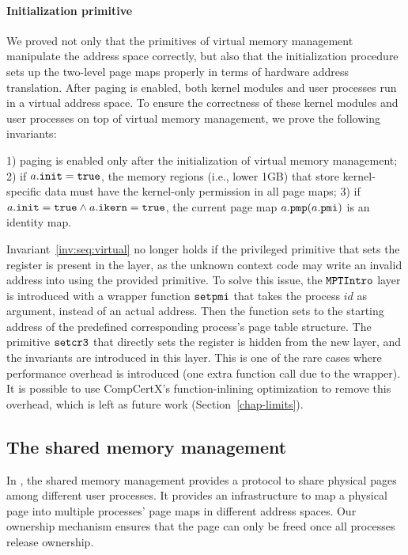 \paragraph{Initialization primitive}
We proved not only that the primitives of virtual memory management
manipulate the address space correctly,
but also that the initialization procedure sets up the two-level page maps properly
in terms of hardware address translation.
After paging is enabled, both kernel modules and user processes
run in a virtual address space.
To ensure the correctness of these kernel modules and user processes on top of virtual memory
management, we prove the following invariants:
\begin{invariant}
\label{inv:seq:virtual}
1) paging is enabled only after the initialization of virtual memory management;
2) if $a.{\texttt{init}} ={\texttt{true}}$, the memory regions (i.e., lower 1GB) that store kernel-specific data must have the kernel-only 
permission in all page maps;
3) if $a.{\texttt{init}} ={\texttt{true}} \wedge a.{\texttt{ikern}} ={\texttt{true}} $, 
the current page map $a.{\texttt{pmp}}(a.{\texttt{pmi}})$
is an identity map.
\end{invariant}

Invariant~\ref{inv:seq:virtual} no longer holds 
if the privileged primitive that sets the 
register is present in the layer, as the unknown context code may write
an invalid address into  using the provided primitive. To solve this issue, 
the ${\texttt{MPTIntro}}$
layer is introduced with a wrapper function 
${\texttt{setpmi}}$
that takes the process $id$ as argument,
instead of an actual address. Then the function sets  to the
starting address of the predefined corresponding process's page table structure.
The primitive ${\texttt{setcr3}}$ that directly sets the  register is hidden from the
new layer, and the invariants are introduced in this layer.
This is one of the rare cases where performance overhead is introduced
(one extra function call due to the wrapper).
It is possible to use CompCertX's function-inlining optimization
to remove this overhead, which is left as future work (\cf Section~\ref{chap-limits}).

\subsection{The shared memory management} 
In \mCTOS{}, the shared memory management provides a protocol to share physical
pages among different user processes. 
It provides an infrastructure to map a physical page into multiple
processes' page maps in different address spaces.
Our ownership mechanism ensures that the page can only be freed once 
all processes release ownership.

